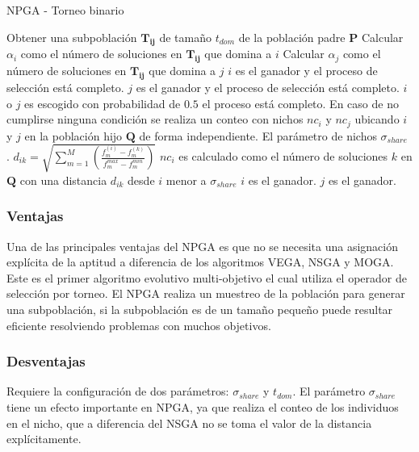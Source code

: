 \begin{algorithm}[H]
  \scriptsize
	\caption{NPGA - Torneo binario} 
	\begin{algorithmic}[1]
   \STATE Obtener una subpoblación $\mathbf{T_{ij}}$ de tamaño $t_{dom}$ de la población padre $\mathbf{P}$ 
   \STATE Calcular $\alpha_i$ como el número de soluciones en $\mathbf{T_{ij}}$ que domina a $i$  
     \STATE Calcular $\alpha_j$ como el número de soluciones en $\mathbf{T_{ij}}$ que domina a $j$
        \STATE $i$ es el ganador y el proceso de selección está completo.
      	 \STATE $j$ es el ganador y el proceso de selección está completo.
      \ELSE
            \STATE $i$ o $j$ es escogido con probabilidad de $0.5$ el proceso está completo.
          \ENDIF
          \STATE En caso de no cumplirse ninguna condición se realiza un conteo con nichos $nc_i$ y $nc_j$ ubicando $i$ y $j$ en la población hijo $\mathbf{Q}$ de forma independiente. El parámetro de nichos $\sigma_{share}$ .
          \STATE $d_{ik} = \sqrt{ \sum_{m=1}^M  \left ( \frac{ f_m^{(i)} -f_m^{(k)}  }{ f_m^{max} - f_m^{min} }  \right )}$ 
          \STATE $nc_{i}$ es calculado como el número de soluciones $k$ en $\mathbf{Q}$ con una distancia $d_{ik}$ desde $i$ menor a $\sigma_{share}$ 
             \STATE $i$ es el ganador.
            \ELSE
               \STATE $j$ es el ganador.
          \ENDIF
     \ENDIF
    \end{algorithmic}
    \label{alg1}
\end{algorithm}



\subsubsection*{Ventajas}
Una de las principales ventajas del NPGA es que no se necesita una asignación explícita de la aptitud a diferencia de los algoritmos VEGA, NSGA y MOGA.
Este es el primer algoritmo evolutivo multi-objetivo el cual utiliza el operador de selección por torneo.
El NPGA realiza un muestreo de la población para generar una subpoblación, si la subpoblación es de un tamaño pequeño puede resultar eficiente resolviendo problemas con muchos objetivos.
\subsubsection*{Desventajas}
Requiere la configuración de dos parámetros: $\sigma_{share}$ y $t_{dom}$. El parámetro $\sigma_{share}$ tiene un efecto importante en NPGA, ya que realiza el conteo de los individuos en el nicho, que a diferencia del NSGA no se toma el valor de la distancia explícitamente.

